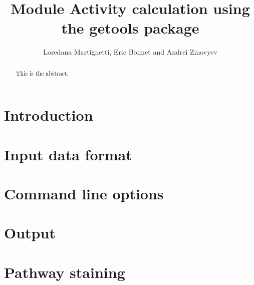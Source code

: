 \documentclass[a4]{article}
\title{Module Activity calculation using the getools package}
\author{Loredana Martignetti, Eric Bonnet and Andrei Zinovyev}
\begin{document}
\maketitle
\begin{abstract}
This is the abstract.
\end{abstract}


\section{Introduction}

\section{Input data format}

\section{Command line options}

\section{Output}


\section{Pathway staining}
\end{document}
